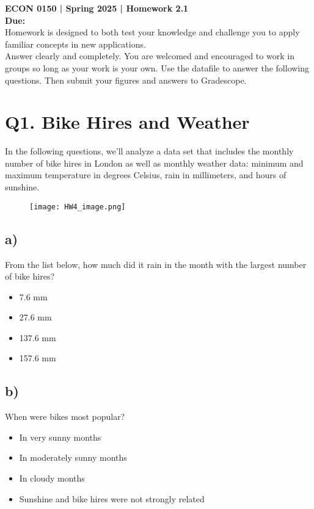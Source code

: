 \documentclass[12pt]{article}
\begin{document}
\vspace*{-1cm}
\noindent \textbf{ECON 0150 | Spring 2025 | Homework 2.1} \\
\textbf{Due: } \\

\noindent Homework is designed to both test your knowledge and challenge you to apply familiar concepts in new applications. \\
Answer clearly and completely. You are welcomed and encouraged to work in groups so long as your work is your own. Use the datafile to answer the following questions. Then submit your figures and answers to Gradescope.

\section*{Q1. Bike Hires and Weather}

\noindent In the following questions, we'll analyze a data set that includes the monthly number of bike hires in London as well as monthly weather data: minimum and maximum temperature in degrees Celsius, rain in millimeters, and hours of sunshine.

\begin{figure}[h]
    \centering
    \texttt{[image: HW4\_image.png]}
\end{figure}

\subsection*{a)} From the list below, how much did it rain in the month with the largest number of bike hires?

\begin{itemize}[leftmargin=1.5cm]
    \item 7.6 mm
    \item 27.6 mm
    \item 137.6 mm
    \item 157.6 mm
\end{itemize}

\subsection*{b)} When were bikes most popular?

\begin{itemize}[leftmargin=1.5cm]
    \item In very sunny months
    \item In moderately sunny months
    \item In cloudy months
    \item Sunshine and bike hires were not strongly related
\end{itemize}
\end{document}
